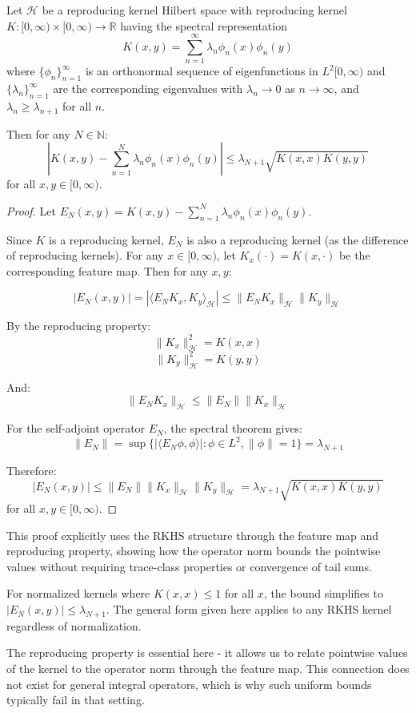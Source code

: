 \documentclass{article}
\begin{document}
\begin{theorem}
Let $\mathcal{H}$ be a reproducing kernel Hilbert space with reproducing kernel $K: [0,\infty) \times [0,\infty) \to \mathbb{R}$ having the spectral representation
\[ K(x,y) = \sum_{n=1}^{\infty} \lambda_n\phi_n(x)\phi_n(y) \]
where $\{\phi_n\}_{n=1}^{\infty}$ is an orthonormal sequence of eigenfunctions in $L^2[0,\infty)$ and $\{\lambda_n\}_{n=1}^{\infty}$ are the corresponding eigenvalues with $\lambda_n \to 0$ as $n \to \infty$, and $\lambda_n \geq \lambda_{n+1}$ for all $n$.

Then for any $N \in \mathbb{N}$:
\[ |K(x,y) - \sum_{n=1}^N \lambda_n\phi_n(x)\phi_n(y)| \leq \lambda_{N+1}\sqrt{K(x,x)K(y,y)} \]
for all $x,y \in [0,\infty)$.
\end{theorem}

\begin{proof}
Let $E_N(x,y) = K(x,y) - \sum_{n=1}^N \lambda_n\phi_n(x)\phi_n(y)$. 

Since $K$ is a reproducing kernel, $E_N$ is also a reproducing kernel (as the difference of reproducing kernels). For any $x \in [0,\infty)$, let $K_x(\cdot) = K(x,\cdot)$ be the corresponding feature map. Then for any $x,y$:

\[ |E_N(x,y)| = |\langle E_NK_x, K_y \rangle_{\mathcal{H}}| \leq \|E_NK_x\|_{\mathcal{H}} \|K_y\|_{\mathcal{H}} \]

By the reproducing property:
\[ \|K_x\|_{\mathcal{H}}^2 = K(x,x) \]
\[ \|K_y\|_{\mathcal{H}}^2 = K(y,y) \]

And:
\[ \|E_NK_x\|_{\mathcal{H}} \leq \|E_N\| \|K_x\|_{\mathcal{H}} \]

For the self-adjoint operator $E_N$, the spectral theorem gives:
\[ \|E_N\| = \sup\{|\langle E_N\phi, \phi \rangle|: \phi \in L^2, \|\phi\| = 1\} = \lambda_{N+1} \]

Therefore:
\[ |E_N(x,y)| \leq \|E_N\| \|K_x\|_{\mathcal{H}} \|K_y\|_{\mathcal{H}} = \lambda_{N+1} \sqrt{K(x,x)K(y,y)} \]
for all $x,y \in [0,\infty)$.
\end{proof}

\begin{remark}
This proof explicitly uses the RKHS structure through the feature map and reproducing property, showing how the operator norm bounds the pointwise values without requiring trace-class properties or convergence of tail sums.
\end{remark}

\begin{remark}
For normalized kernels where $K(x,x) \leq 1$ for all $x$, the bound simplifies to $|E_N(x,y)| \leq \lambda_{N+1}$. The general form given here applies to any RKHS kernel regardless of normalization.
\end{remark}

\begin{remark}
The reproducing property is essential here - it allows us to relate pointwise values of the kernel to the operator norm through the feature map. This connection does not exist for general integral operators, which is why such uniform bounds typically fail in that setting.
\end{remark}
\end{document}
